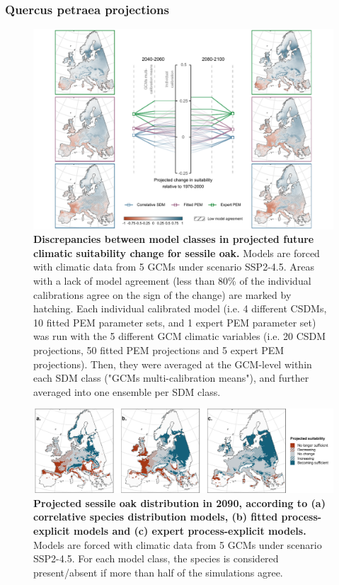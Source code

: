 \clearpage

\subsubsection{Quercus petraea projections}

\begin{figure}[htpb]
\centering
\includegraphics{chapter4/figs/quercuspetraea_cascade-1.pdf}
\caption{\textbf{Discrepancies between model classes in projected future climatic suitability change for sessile oak.} Models are forced with climatic data from 5 GCMs under scenario SSP2-4.5. Areas with a lack of model agreement (less than 80\% of the individual calibrations agree on the sign of the change) are marked by hatching. Each individual calibrated model (i.e. 4 different CSDMs, 10 fitted PEM parameter sets, and 1 expert PEM parameter set) was run with the 5 different GCM climatic variables (i.e. 20 CSDM projections, 50 fitted PEM projections and 5 expert PEM projections). Then, they were averaged at the GCM-level within each SDM class ("GCMs multi-calibration means"), and further averaged into one ensemble per SDM class.}
\label{app:qpetproj}
\end{figure}

\begin{figure}[htpb]
\centering
\vspace*{-0.2cm}
\includegraphics{chapter4/figs/quercuspetraea_distributions-1.pdf}
\caption{\textbf{Projected sessile oak distribution in 2090, according to (a) correlative species distribution models, (b) fitted process-explicit models and (c) expert process-explicit models.} Models are forced with climatic data from 5 GCMs under scenario SSP2-4.5. For each model class, the species is considered present/absent if more than half of the simulations agree.}
\label{app:qpetdist}
\vspace*{-6cm}
\end{figure}

